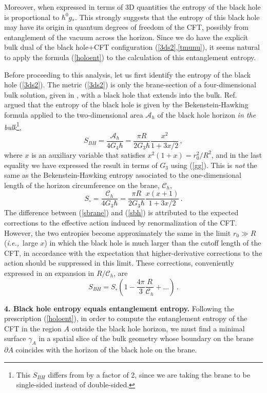 \documentclass[12pt]{article}
\newcommand{\beq}{\begin{equation}}
\newcommand{\eeq}{\end{equation}}
\newcommand{\ie}{{\it i.e.,}\ }
\newcommand{\reef}[1]{(\ref{#1})}
\begin{document}
Moreover, when expressed in terms of 3D quantities the entropy of the
black hole is proportional to $\hbar^0 g_*$. This strongly suggests
that the entropy of this black hole may have its origin in quantum
degrees of freedom of the CFT, possibly from entanglement of the vacuum
across the horizon. Since we do have
the explicit bulk dual of the black hole+CFT configuration
(\ref{3ds2},\ref{tmunu}), it seems natural to apply the formula
\reef{holoent} to the calculation of this entanglement entropy.

Before proceeding to this analysis, let us first identify the entropy of
the black hole \reef{3ds2}. The metric \reef{3ds2} is only the
brane-section of a four-dimensional bulk solution, given in \cite{ehm1},
with a black hole that extends into the bulk. Ref.~\cite{ehm1} argued
that the entropy of the black hole is given by the Bekenstein-Hawking
formula applied to the two-dimensional area $\mathcal{A}_{h}$ of the
black hole horizon {\em in the bulk}\footnote{This $S_{BH}$ differs from
\cite{ehm1} by a factor of 2, since we are taking the brane to be
single-sided instead of double-sided.},
\beq\label{sbrane}
S_{BH}=\frac{\mathcal{A}_{h}}{4G_{4}\hbar} 
=\frac{\pi R}{2G_3\hbar}\frac{x^2}{1+3x/2}\,,
\eeq
where $x$ is an auxiliary variable that satisfies $x^2(1+x)=r_0^2/R^2$,
and in the last equality we have expressed the result in terms of $G_3$
using \reef{gg}.
This is \textit{not} the same as the Bekenstein-Hawking entropy
associated to the one-dimensional length of the horizon circumference on
the brane,
$\mathcal{C}_{h}$,
\beq\label{sbh}
S_{\circ}=\frac{\mathcal{C}_{h}}{4G_3\hbar} 
= \frac{\pi R}{2G_3\hbar}\frac{x(x+1)}{1+3x/2}\,.
\eeq
The difference between \reef{sbrane} and \reef{sbh} is attributed to the
expected corrections to the effective action induced by renormalization
of the CFT. However, the two entropies become approximately the same in
the limit $r_0\gg R$ (\ie large $x$) in which the black hole is much
larger than the cutoff length of the CFT, in accordance with the
expectation that higher-derivative corrections to the action should be
suppressed in this limit. These corrections, conveniently expressed in
an expansion in $R/\mathcal{C}_{h}$, are
\beq\label{sbhso}
S_{BH}=S_{\circ}\left(1-\frac{4\pi}{3}\frac{R}{\mathcal{C}_{h}}
+\dots
\right)\,.
\eeq


\bigskip

\noindent\textbf{4. Black hole entropy equals entanglement entropy.}
Following the prescription \reef{holoent}, in order to compute the
entanglement entropy of the CFT in the region $A$ outside the black hole
horizon, we must find a minimal surface $\gamma_A$ in a spatial slice of
the bulk geometry whose boundary on the brane $\partial A$ coincides
with the horizon of the black hole on the brane. 
\end{document}
